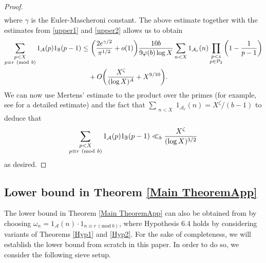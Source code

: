\documentclass[12pt]{amsart}
\numberwithin{equation}{section}
\theoremstyle{remark}
\theoremstyle{definition}
\newcommand{\imod}[1]{\ (\mathrm{mod}\ #1)}
\begin{document}
\begin{proof}
\begin{align}
\end{align}
where $\gamma$ is the Euler-Mascheroni constant. The above estimate together with the estimates from \eqref{upper1} and \eqref{upper2} allows us to obtain
\begin{align}
\notag \sum_{\substack{p<X\\p\equiv r\imod b}}1_{\mathcal{A}}(p)1_{\mathbb{B}}(p-1) \leq &~\bigg(\dfrac{2e^{\gamma/2}}{\pi^{1/2}} + o(1)\bigg) \dfrac{10b}{9\varphi(b)\log X}\sum_{\substack{n<X}}1_{\mathcal{A}_r}(n)\prod_{\substack{p<z\\p\in \mathcal{P}_3}}\bigg(1-\dfrac{1}{p-1}\bigg)\\
\notag &+ O\bigg(\dfrac{X^{\zeta}}{(\log X)^A} + X^{9/10}\bigg).
\end{align}
We can now use Mertens' estimate \cite[Theorem 3.4(c)]{kou} to the product over the primes (for example, see \cite[p.278]{opera} for a detailed estimate) and the fact that $\sum_{\substack{n<X}}1_{\mathcal{A}_r}(n)=X^\zeta/(b-1)$ to deduce that 
\begin{align}
\notag \sum_{\substack{p<X\\p\equiv r\imod b}}1_{\mathcal{A}}(p) 1_{\mathbb{B}}(p-1) \ll_{b} \dfrac{X^{\zeta}}{(\log X)^{3/2}}
\end{align}
as desired.
\end{proof}














\subsection{Lower bound in Theorem \ref{Main TheoremApp}}
The lower bound in Theorem \ref{Main TheoremApp} can also be obtained from \cite[Theorem 6.5]{Ter} by choosing $\omega_n=1_{\mathcal{A}}(n)\cdot 1_{n\equiv r\imod b}$, where Hypothesis 6.4 holds by considering variants of Theorems \ref{Hyp1} and \ref{Hyp2}. For the sake of completeness, we will establish the lower bound from scratch in this paper. In order to do so, we consider the following sieve setup.
\end{document}
